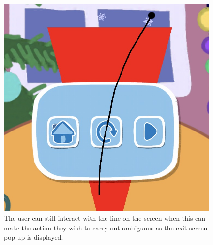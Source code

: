 \documentclass[11pt]{article}
\begin{document}
                \begin{figure}[!ht]
                        \begin{minipage}{0.32\textwidth}
                            \centering \includegraphics[width=0.8\linewidth]{Images/peppa/peppaGlitchLine}
                            \caption{The user can still interact with the line on the screen when this can make the action they wish to carry out ambiguous as the exit screen pop-up is displayed.}
                            \label{fig:peppaGlitchLine}
                        \end{minipage}
                        \begin{minipage}{0.32\textwidth}
                            \centering

\end{minipage}
\end{figure}
\end{document}
